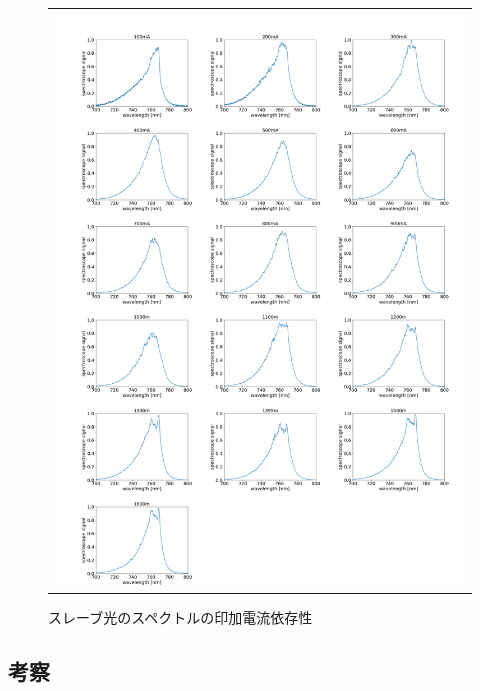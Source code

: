 \documentclass[uplatex, dvipdfmx, a4paper, report, papersize, 11pt]{jsbook}
\begin{document}
\newpage
\begin{figure}[H]
  \centering
    \begin{tabular}{c}
      \begin{minipage}{1\hsize}
        \centering
          \includegraphics[keepaspectratio,  scale=0.20,  angle=0]
                          {figures/chapter4/766_slave-current_spectrum.png}
                          \caption{スレーブ光のスペクトルの印加電流依存性}
                          \label{766_slave-current_spectrum}
      \end{minipage}

  \end{tabular}
\end{figure}
\newpage

\subsection{考察}
\end{document}
